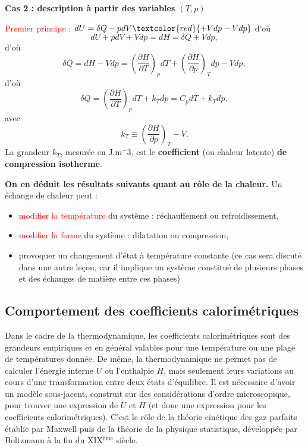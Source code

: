\documentclass[11pt,a4paper]{report}
\begin{document}
\textbf{Cas 2 : description à partir des variables $(T,p)$}

\textcolor{red}{Premier principe} : $dU = \delta Q - pdV \textcolor{red}{+ Vdp - Vdp}$
d'où
\begin{equation}
	dU + pdV + Vdp = dH = \delta Q + Vdp,
\end{equation}
d'où
\begin{equation}
	\delta Q = dH - Vdp = \left(\frac{\partial H}{\partial T}\right)_p dT + \left(\frac{\partial H}{\partial p}\right)_T dp - Vdp,
\end{equation}
d'où
\begin{equation}
	\delta Q = \left(\frac{\partial H}{\partial T}\right)_p dT + k_T dp = C_p dT + k_T dp,
\end{equation}
avec
\begin{equation}
	k_T \equiv \left(\frac{\partial H}{\partial p}\right)_T - V.
\end{equation}
La grandeur $k_T$, mesurée en J.m${^-3}$, est le \textbf{coefficient} (ou chaleur latente) \textbf{de compression isotherme}.

\textbf{On en déduit les résultats suivants quant au rôle de la chaleur.}
Un échange de chaleur peut :
\begin{itemize}
	\item \textcolor{red}{modifier la température} du système : réchauffement ou refroidissement,
	\item \textcolor{red}{modifier la forme} du système : dilatation ou compression,
	\item provoquer un changement d'état à température constante (ce cas sera discuté dans une autre leçon, car il implique un système constitué de plusieurs phases 
	et des échanges de matière entre ces phases)\\
\end{itemize}

\subsection{Comportement des coefficients calorimétriques}

Dans le cadre de la thermodynamique, les coefficients calorimétriques sont des grandeurs empiriques et en général valables pour une température ou une plage de températures donnée. De même, la thermodynamique ne permet pas de calculer l'énergie interne $U$ ou l'enthalpie $H$, mais seulement leurs variations au cours d'une transformation entre deux états d'équilibre. Il est nécessaire d'avoir un modèle sous-jacent, construit sur des considérations d'ordre microscopique, pour trouver une expression de $U$ et $H$ (et donc une expression pour les coefficients calorimétriques). C'est le rôle de la théorie cinétique des gaz parfaits établie par Maxwell puis de la théorie de la physique statistique, développée par Boltzmann à la fin du XIX$^\text{ème}$ siècle. 
\end{document}
